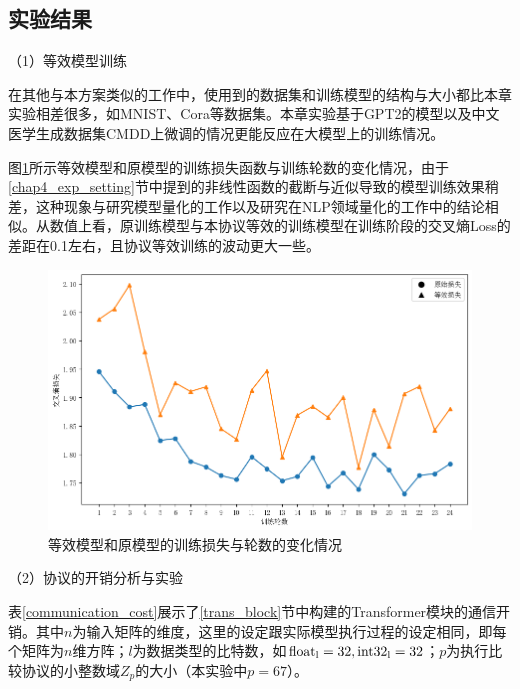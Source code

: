 \subsection{实验结果}

（1）等效模型训练

在其他与本方案类似的工作中\cite{secureml, secgnn, SecureNN}，使用到的数据集和训练模型的结构与大小都比本章实验相差很多，如MNIST、Cora等数据集。本章实验基于GPT2的模型以及中文医学生成数据集CMDD上微调的情况更能反应在大模型上的训练情况。

图\ref{Chap4_clip_param_Loss}所示等效模型和原模型的训练损失函数与训练轮数的变化情况，由于\ref{chap4_exp_setting}节中提到的非线性函数的截断与近似导致的模型训练效果稍差，这种现象与研究模型量化的工作\cite{fixpoint_bp_train, Post_training_piecewise_lin}以及研究在NLP领域量化\cite{gupta2020compression, zafrir2019q8bert}的工作中的结论相似。从数值上看，原训练模型与本协议等效的训练模型在训练阶段的交叉熵Loss的差距在0.1左右，且协议等效训练的波动更大一些。
\begin{figure}[h]
	\centering
	\includegraphics[width=0.8\linewidth]{figures/Chap4_clip_param_Loss.png}
	\caption{等效模型和原模型的训练损失与轮数的变化情况}
	\label{Chap4_clip_param_Loss}
\end{figure}


（2）协议的开销分析与实验

表\ref{communication_cost}展示了\ref{trans_block}节中构建的Transformer模块的通信开销。其中$n$为输入矩阵的维度，这里的设定跟实际模型执行过程的设定相同，即每个矩阵为$n$维方阵；$l$为数据类型的比特数，如$\rm float_l=32, int32_l=32$；$p$为执行比较协议的小整数域$Z_p$的大小（本实验中$p=67$）。

